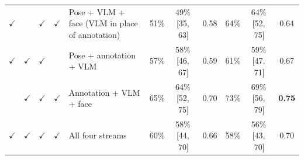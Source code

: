 \documentclass[11pt]{article}
\newcommand{\best}[1]{\textbf{#1}}
\newcommand{\ci}[2]{\,[#1,\,#2]}
\begin{document}
\begin{table}[!htbp]
\begin{tabular}{cccclcccccc}
$\checkmark$ & & $\checkmark$ & $\checkmark$ & Pose + VLM + face (VLM in place of annotation) & 51\% & 49\%\ci{35}{63} & 0.58 & 64\% & 64\%\ci{52}{75} & 0.64 \\
$\checkmark$ & $\checkmark$ & $\checkmark$ & & Pose + annotation + VLM & 57\% & 58\%\ci{46}{67} & 0.59 & 61\% & 59\%\ci{47}{71} & 0.67 \\
 & $\checkmark$ & $\checkmark$ & $\checkmark$ & Annotation + VLM + face & 65\% & 64\%\ci{52}{75} & 0.70 & 73\% & 69\%\ci{56}{79} & \best{0.75} \\
\midrule
$\checkmark$ & $\checkmark$ & $\checkmark$ & $\checkmark$ & All four streams & 60\% & 58\%\ci{44}{70} & 0.66 & 58\% & 56\%\ci{43}{70} & 0.70 \\
\bottomrule
\end{tabular}
\end{table}
\end{document}
